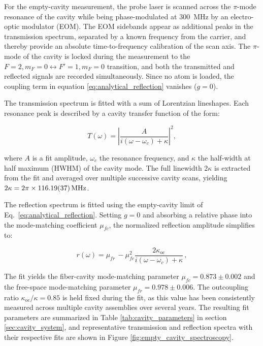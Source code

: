 For the empty-cavity measurement, the probe laser is scanned across the $\pi$-mode resonance of the cavity while being phase-modulated at \SI{300}{\mega\hertz} by an electro-optic modulator (EOM). The EOM sidebands appear as additional peaks in the transmission spectrum, separated by a known frequency from the carrier, and thereby provide an absolute time-to-frequency calibration of the scan axis. The $\pi$-mode of the cavity is locked during the measurement to the $F=2,m_F=0\leftrightarrow F'=1,m_F=0$ transition, and both the transmitted and reflected signals are recorded simultaneously. Since no atom is loaded, the coupling term in equation \eqref{eq:analytical_reflection} vanishes ($g = 0$).

The transmission spectrum is fitted with a sum of Lorentzian lineshapes. Each resonance peak is described by a cavity transfer function of the form:

\begin{equation}
	T(\omega) = \left|\frac{A}{i(\omega - \omega_c) + \kappa}\right|^2,
	\label{eq:lorentzian_transmission}
\end{equation}

where $A$ is a fit amplitude, $\omega_c$ the resonance frequency, and $\kappa$ the half-width at half maximum (HWHM) of the cavity mode. The full linewidth $2\kappa$ is extracted from the fit and averaged over multiple successive cavity scans, yielding $2\kappa = 2\pi \times \SI{116.19\pm0.37}{MHz}$.

The reflection spectrum is fitted using the empty-cavity limit of Eq.~\eqref{eq:analytical_reflection}. Setting $g = 0$ and absorbing a relative phase into the mode-matching coefficient $\mu_{fc}$, the normalized reflection amplitude simplifies to:

\begin{equation}
	r(\omega) = \mu_{fr}\,
	- \mu_{fc}^2
	\frac{2\kappa_{\text{oc}}}{i(\omega - \omega_c) + \kappa}\,,
	\label{eq:empty_cavity_reflection}
\end{equation}

The fit yields the fiber-cavity mode-matching parameter $\mu_{fc} = 0.873\pm0.002$ and the free-space mode-matching parameter $\mu_{fr} = 0.978\pm0.006$. The outcoupling ratio $\kappa_{\text{oc}}/\kappa = 0.85$ is held fixed during the fit, as this value has been consistently measured across multiple cavity assemblies over several years. The resulting fit parameters are summarized in Table \ref{tab:cavity_parameters} in section \ref{sec:cavity_system}, and representative transmission and reflection spectra with their respective fits are shown in Figure \ref{fig:empty_cavity_spectroscopy}.

